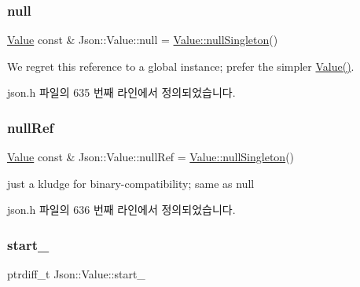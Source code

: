 \subsubsection{\texorpdfstring{null}{null}}
{\footnotesize\ttfamily \hyperlink{class_json_1_1_value}{Value} const  \& Json\+::\+Value\+::null = \hyperlink{class_json_1_1_value_af2f124567acc35d021a424e53ebdfcab}{Value\+::null\+Singleton}()\hspace{0.3cm}{\ttfamily [static]}}



We regret this reference to a global instance; prefer the simpler \hyperlink{class_json_1_1_value_ada6ba1369448fb0240bccc36efaa46f7}{Value()}. 



json.\+h 파일의 635 번째 라인에서 정의되었습니다.

\mbox{\label{class_json_1_1_value_aaee27e622f87266f861216d644603730}} 
\subsubsection{\texorpdfstring{null\+Ref}{nullRef}}
{\footnotesize\ttfamily \hyperlink{class_json_1_1_value}{Value} const  \& Json\+::\+Value\+::null\+Ref = \hyperlink{class_json_1_1_value_af2f124567acc35d021a424e53ebdfcab}{Value\+::null\+Singleton}()\hspace{0.3cm}{\ttfamily [static]}}



just a kludge for binary-\/compatibility; same as null 



json.\+h 파일의 636 번째 라인에서 정의되었습니다.

\mbox{\label{class_json_1_1_value_a1c3aeb0fa8fefe93776cb347c76a25a8}} 
\subsubsection{\texorpdfstring{start\+\_\+}{start\_}}
{\footnotesize\ttfamily ptrdiff\+\_\+t Json\+::\+Value\+::start\+\_\+\hspace{0.3cm}{\ttfamily [private]}}



